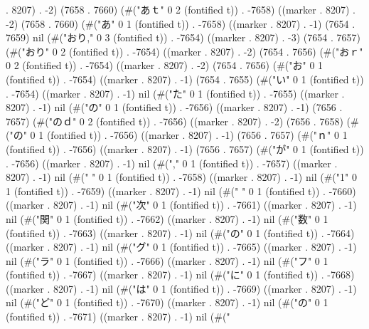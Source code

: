 . 8207) . -2) (7658 . 7660) (#("あｔ" 0 2 (fontified t)) . -7658) ((marker . 8207) . -2) (7658 . 7660) (#("あ" 0 1 (fontified t)) . -7658) ((marker . 8207) . -1) (7654 . 7659) nil (#("おり," 0 3 (fontified t)) . -7654) ((marker . 8207) . -3) (7654 . 7657) (#("おり" 0 2 (fontified t)) . -7654) ((marker . 8207) . -2) (7654 . 7656) (#("おｒ" 0 2 (fontified t)) . -7654) ((marker . 8207) . -2) (7654 . 7656) (#("お" 0 1 (fontified t)) . -7654) ((marker . 8207) . -1) (7654 . 7655) (#("い" 0 1 (fontified t)) . -7654) ((marker . 8207) . -1) nil (#("た" 0 1 (fontified t)) . -7655) ((marker . 8207) . -1) nil (#("の" 0 1 (fontified t)) . -7656) ((marker . 8207) . -1) (7656 . 7657) (#("のｄ" 0 2 (fontified t)) . -7656) ((marker . 8207) . -2) (7656 . 7658) (#("の" 0 1 (fontified t)) . -7656) ((marker . 8207) . -1) (7656 . 7657) (#("ｎ" 0 1 (fontified t)) . -7656) ((marker . 8207) . -1) (7656 . 7657) (#("が" 0 1 (fontified t)) . -7656) ((marker . 8207) . -1) nil (#("," 0 1 (fontified t)) . -7657) ((marker . 8207) . -1) nil (#(" " 0 1 (fontified t)) . -7658) ((marker . 8207) . -1) nil (#("1" 0 1 (fontified t)) . -7659) ((marker . 8207) . -1) nil (#(" " 0 1 (fontified t)) . -7660) ((marker . 8207) . -1) nil (#("次" 0 1 (fontified t)) . -7661) ((marker . 8207) . -1) nil (#("関" 0 1 (fontified t)) . -7662) ((marker . 8207) . -1) nil (#("数" 0 1 (fontified t)) . -7663) ((marker . 8207) . -1) nil (#("の" 0 1 (fontified t)) . -7664) ((marker . 8207) . -1) nil (#("グ" 0 1 (fontified t)) . -7665) ((marker . 8207) . -1) nil (#("ラ" 0 1 (fontified t)) . -7666) ((marker . 8207) . -1) nil (#("フ" 0 1 (fontified t)) . -7667) ((marker . 8207) . -1) nil (#("に" 0 1 (fontified t)) . -7668) ((marker . 8207) . -1) nil (#("は" 0 1 (fontified t)) . -7669) ((marker . 8207) . -1) nil (#("ど" 0 1 (fontified t)) . -7670) ((marker . 8207) . -1) nil (#("の" 0 1 (fontified t)) . -7671) ((marker . 8207) . -1) nil (#("
